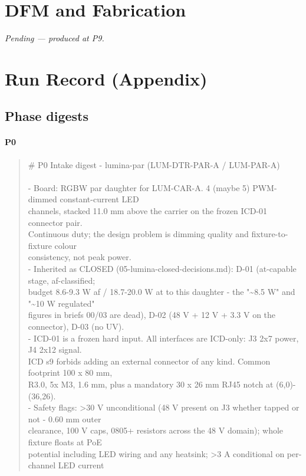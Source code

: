 \documentclass[11pt,a4paper]{article}
\begin{document}
\section{DFM and Fabrication}
\emph{Pending --- produced at P9.}
\section{Run Record (Appendix)}
\subsection*{Phase digests}
\paragraph*{P0}
\begin{quote}\small\ttfamily\raggedright
\# P0 Intake digest - lumina-par (LUM-DTR-PAR-A / LUM-PAR-A)\\
~\\
- Board: RGBW par daughter for LUM-CAR-A. 4 (maybe 5) PWM-dimmed constant-current LED\\
  channels, stacked 11.0 mm above the carrier on the frozen ICD-01 connector pair.\\
  Continuous duty; the design problem is dimming quality and fixture-to-fixture colour\\
  consistency, not peak power.\\
- Inherited as CLOSED (05-lumina-closed-decisions.md): D-01 (at-capable stage, af-classified;\\
  budget 8.6-9.3 W af / 18.7-20.0 W at to this daughter - the "\textasciitilde{}8.5 W" and "\textasciitilde{}10 W regulated"\\
  figures in briefs 00/03 are dead), D-02 (48 V + 12 V + 3.3 V on the connector), D-03 (no UV).\\
- ICD-01 is a frozen hard input. All interfaces are ICD-only: J3 2x7 power, J4 2x12 signal.\\
  ICD s9 forbids adding an external connector of any kind. Common footprint 100 x 80 mm,\\
  R3.0, 5x M3, 1.6 mm, plus a mandatory 30 x 26 mm RJ45 notch at (6,0)-(36,26).\\
- Safety flags: \textgreater{}30 V unconditional (48 V present on J3 whether tapped or not - 0.60 mm outer\\
  clearance, 100 V caps, 0805+ resistors across the 48 V domain); whole fixture floats at PoE\\
  potential including LED wiring and any heatsink; \textgreater{}3 A conditional on per-channel LED current\\

\end{quote}
\end{document}
